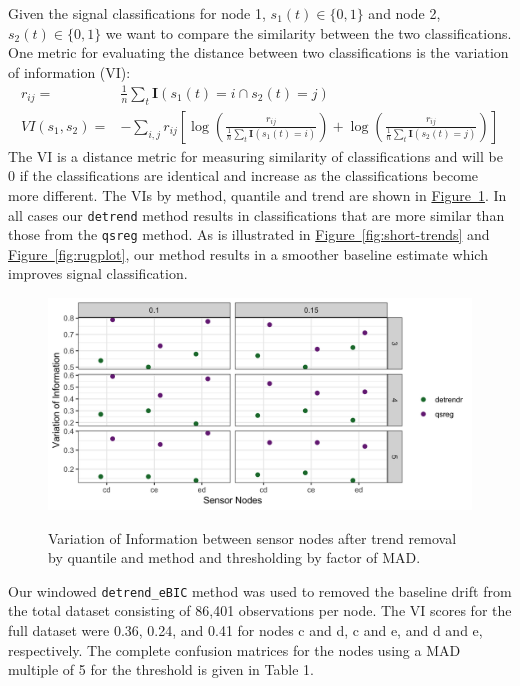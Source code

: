 \documentclass[12pt]{article}
\newcommand{\Fig}[1]{\hyperref[fig:#1]{Figure~\ref*{fig:#1}}} %
\newcommand{\Fig}[1]{{Figure~\ref{fig:#1}}} %
\begin{document}
	Given the signal classifications for node 1, $s_1(t) \in \{0,1\}$ and node 2, $s_2(t)\in\{0,1\}$ we want to compare the similarity between the two classifications. One metric for evaluating the distance between two classifications is the variation of information (VI): 
	\begin{align*}
		r_{ij} =& \frac{1}{n}\sum_t \mathbf{I}(s_1(t) = i  \cap s_2(t) = j)\\
		VI(s_1, s_2) =& -\sum_{i,j} r_{ij} \left[ \log \left(\frac{r_{ij}}{\frac{1}{n}\sum_t \mathbf{I}(s_1(t) = i)}\right) + 
		\log \left(\frac{r_{ij}}{\frac{1}{n}\sum_t \mathbf{I}(s_2(t) = j)}\right) \right]
	\end{align*}	
	The VI is a distance metric for measuring similarity of classifications and will be 0 if the classifications are identical and increase as the classifications become more different. The VIs by method, quantile and trend are shown in \Fig{vi}. In all cases our \texttt{detrend} method results in classifications that are more similar than those from the \texttt{qsreg} method. As is illustrated in \Fig{short-trends} and \Fig{rugplot}, our method results in a smoother baseline estimate which improves signal classification. 
		
	\begin{figure}
		\centering
		\caption{Variation of Information between sensor nodes after trend removal by quantile and method and thresholding by factor of MAD.}
		\includegraphics[width = .9\linewidth]{Figures/VI_app_short.png}
		\label{fig:vi}
	\end{figure}
	
	Our windowed \texttt{detrend\_eBIC} method was used to removed the baseline drift from the total dataset consisting of 86,401 observations per node. The VI scores for the full dataset were 0.36, 0.24, and 0.41 for nodes c and d, c and e, and d and e, respectively. The complete confusion matrices for the nodes using a MAD multiple of 5 for the threshold is given in Table 1. 
		
\end{document}
